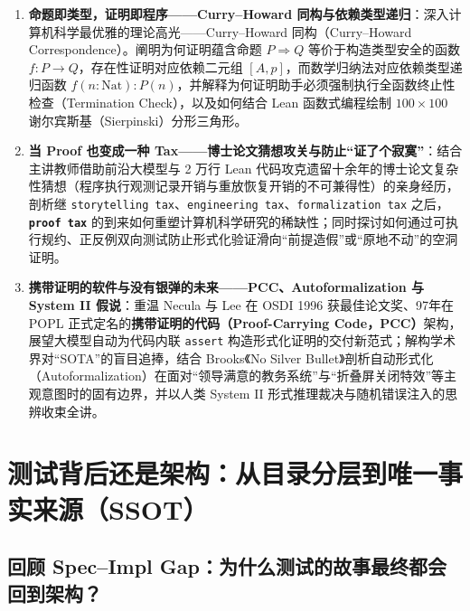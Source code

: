 \documentclass[a4paper]{article}
\begin{document}
\begin{enumerate}
    \item \textbf{命题即类型，证明即程序——Curry--Howard 同构与依赖类型递归}：深入计算机科学最优雅的理论高光——Curry--Howard 同构（Curry--Howard Correspondence）。阐明为何证明蕴含命题 $P \Rightarrow Q$ 等价于构造类型安全的函数 $f: P \to Q$，存在性证明对应依赖二元组 $[A, p]$，而数学归纳法对应依赖类型递归函数 $f(n:\mathrm{Nat}): P(n)$，并解释为何证明助手必须强制执行全函数终止性检查（Termination Check），以及如何结合 Lean 函数式编程绘制 $100 \times 100$ 谢尔宾斯基（Sierpinski）分形三角形。
    \item \textbf{当 Proof 也变成一种 Tax——博士论文猜想攻关与防止“证了个寂寞”}：结合主讲教师借助前沿大模型与 2 万行 Lean 代码攻克遗留十余年的博士论文复杂性猜想（程序执行观测记录开销与重放恢复开销的不可兼得性）的亲身经历，剖析继 \texttt{storytelling tax}、\texttt{engineering tax}、\texttt{formalization tax} 之后，\textbf{\texttt{proof tax}} 的到来如何重塑计算机科学研究的稀缺性；同时探讨如何通过可执行规约、正反例双向测试防止形式化验证滑向“前提造假”或“原地不动”的空洞证明。
    \item \textbf{携带证明的软件与没有银弹的未来——PCC、Autoformalization 与 System II 假说}：重温 Necula 与 Lee 在 OSDI 1996 获最佳论文奖、97年在 POPL 正式定名的\textbf{携带证明的代码（Proof-Carrying Code，PCC）}架构，展望大模型自动为代码内联 \texttt{assert} 构造形式化证明的交付新范式；解构学术界对“SOTA”的盲目追捧，结合 Brooks《No Silver Bullet》剖析自动形式化（Autoformalization）在面对“领导满意的教务系统”与“折叠屏关闭特效”等主观意图时的固有边界，并以人类 System II 形式推理裁决与随机错误注入的思辨收束全讲。
\end{enumerate}

\newpage
\tableofcontents
\newpage

\section{测试背后还是架构：从目录分层到唯一事实来源（SSOT）}

\subsection{回顾 Spec--Impl Gap：为什么测试的故事最终都会回到架构？}
\end{document}
